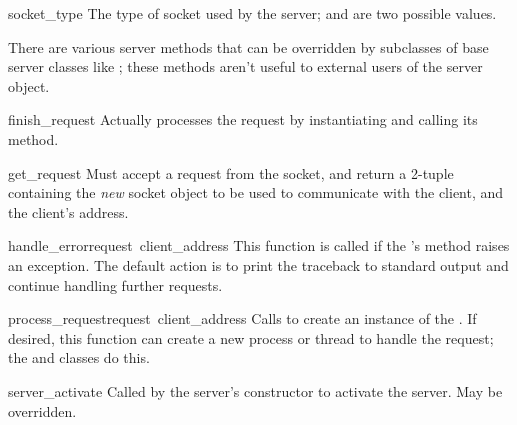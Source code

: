 \begin{datadesc}{socket_type}
The type of socket used by the server;  and
 are two possible values.
\end{datadesc}

There are various server methods that can be overridden by subclasses
of base server classes like ; these methods aren't
useful to external users of the server object.


\begin{funcdesc}{finish_request}{}
Actually processes the request by instantiating
 and calling its  method.
\end{funcdesc}

\begin{funcdesc}{get_request}{}
Must accept a request from the socket, and return a 2-tuple containing
the \emph{new} socket object to be used to communicate with the
client, and the client's address.
\end{funcdesc}

\begin{funcdesc}{handle_error}{request\, client_address}
This function is called if the 's
 method raises an exception.  The default action is to print
the traceback to standard output and continue handling further requests.
\end{funcdesc}

\begin{funcdesc}{process_request}{request\, client_address}
Calls  to create an instance of the
.  If desired, this function can create a new
process or thread to handle the request; the  and
 classes do this.
\end{funcdesc}


\begin{funcdesc}{server_activate}{}
Called by the server's constructor to activate the server.
May be overridden.
\end{funcdesc}

